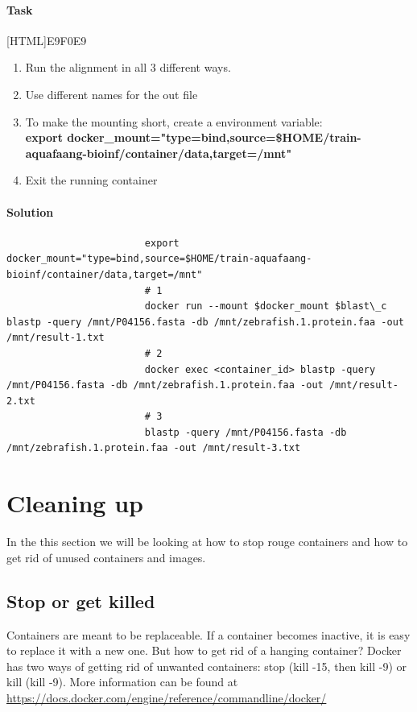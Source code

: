 \documentclass[12pt]{article}
\begin{document}
			\paragraph{Task}
				[HTML]{E9F0E9}{\parbox{\linewidth}{%
						\begin{enumerate}
							\item Run the alignment in all 3 different ways.
							\item Use different names for the out file
							\item To make the mounting short, create a environment variable: \\
							\textbf{export docker\_mount="type=bind,source=\$HOME/train-aquafaang-bioinf/container/data,target=/mnt"}
							\item Exit the running container
						\end{enumerate}
				}}

			\paragraph{Solution}	
	
				\begin{minipage}{\linewidth}
					\begin{lstlisting}
						export docker_mount="type=bind,source=$HOME/train-aquafaang-bioinf/container/data,target=/mnt"
						# 1
						docker run --mount $docker_mount $blast\_c blastp -query /mnt/P04156.fasta -db /mnt/zebrafish.1.protein.faa -out /mnt/result-1.txt
						# 2
						docker exec <container_id> blastp -query /mnt/P04156.fasta -db /mnt/zebrafish.1.protein.faa -out /mnt/result-2.txt
						# 3
						blastp -query /mnt/P04156.fasta -db /mnt/zebrafish.1.protein.faa -out /mnt/result-3.txt
					\end{lstlisting}
				\end{minipage}
				
			
			\section{Cleaning up}
				In the this section we will be looking at how to stop rouge containers and how to get rid of unused containers and images.
			
				\subsection{Stop or get killed}
					Containers are meant to be replaceable. 
					If a container becomes inactive, it is easy to replace it with a new one. 
					But how to get rid of a hanging container? 
					Docker has two ways of getting rid of unwanted containers: stop (kill -15, then kill -9) or kill (kill -9). 
					More information can be found at \url{https://docs.docker.com/engine/reference/commandline/docker/} 
\end{document}
